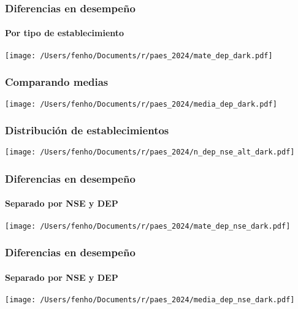 \documentclass{presentacion}
\begin{document}
\begin{frame}
  \frametitle{Diferencias en desempeño}
  \framesubtitle{Por tipo de establecimiento}
  \texttt{[image: /Users/fenho/Documents/r/paes\_2024/mate\_dep\_dark.pdf]}
\end{frame}

\begin{frame}
  \frametitle{Comparando medias}
\centering
\texttt{[image: /Users/fenho/Documents/r/paes\_2024/media\_dep\_dark.pdf]}
\end{frame}

\begin{frame}
  \frametitle{Distribución de establecimientos}
  \texttt{[image: /Users/fenho/Documents/r/paes\_2024/n\_dep\_nse\_alt\_dark.pdf]}
\end{frame}

\begin{frame}
  \frametitle{Diferencias en desempeño}
  \framesubtitle{Separado por NSE y DEP}
  \texttt{[image: /Users/fenho/Documents/r/paes\_2024/mate\_dep\_nse\_dark.pdf]}
\end{frame}

\begin{frame}
\frametitle{Diferencias en desempeño}
\framesubtitle{Separado por NSE y DEP}
\centering
\texttt{[image: /Users/fenho/Documents/r/paes\_2024/media\_dep\_nse\_dark.pdf]}
\end{frame}
\end{document}
